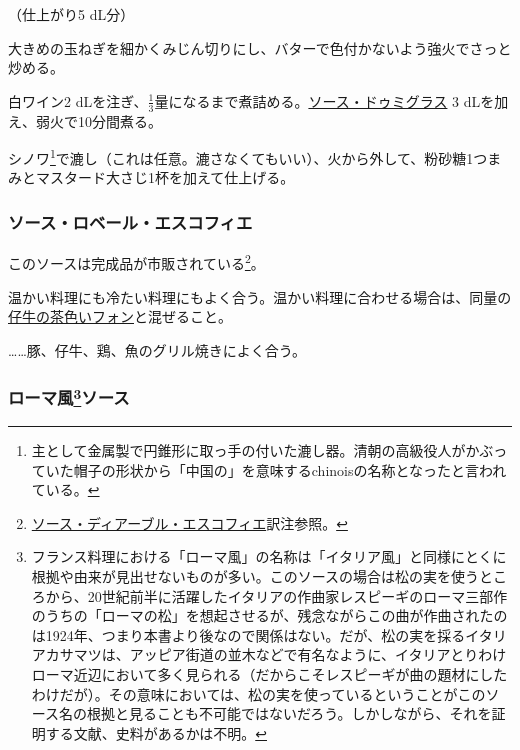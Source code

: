\begin{recette}

 

（仕上がり5 dL分）

大きめの玉ねぎを細かくみじん切りにし、バターで色付かないよう強火でさっと炒める。

白ワイン2
dLを注ぎ、\(\frac{1}{3}\)量になるまで煮詰める。\protect\hyperlink{sauce-demi-glace}{ソース・ドゥミグラス}
3 dLを加え、弱火で10分間煮る。

シノワ\footnote{主として金属製で円錐形に取っ手の付いた漉し器。清朝の高級役人がかぶっていた帽子の形状から「中国の」を意味するchinoisの名称となったと言われている。}で漉し（これは任意。漉さなくてもいい）、火から外して、粉砂糖1つまみとマスタード大さじ1杯を加えて仕上げる。

\atoaki{}

\hypertarget{sauce-robert-escoffier}{%
\subsubsection{ソース・ロベール・エスコフィエ}\label{sauce-robert-escoffier}}



このソースは完成品が市販されている\footnote{\protect\hyperlink{sauce-diable-escoffier}{ソース・ディアーブル・エスコフィエ}訳注参照。}。

温かい料理にも冷たい料理にもよく合う。温かい料理に合わせる場合は、同量の\protect\hyperlink{jus-de-veau-brun}{仔牛の茶色いフォン}と混ぜること。

\ldots{}\ldots{}豚、仔牛、鶏、魚のグリル焼きによく合う。

\atoaki{}

\hypertarget{sauce-romaine}{%
\subsubsection[ローマ風ソース]{\texorpdfstring{ローマ風\footnote{フランス料理における「ローマ風」の名称は「イタリア風」と同様にとくに根拠や由来が見出せないものが多い。このソースの場合は松の実を使うところから、20世紀前半に活躍したイタリアの作曲家レスピーギのローマ三部作のうちの「ローマの松」を想起させるが、残念ながらこの曲が作曲されたのは1924年、つまり本書より後なので関係はない。だが、松の実を採るイタリアカサマツは、アッピア街道の並木などで有名なように、イタリアとりわけローマ近辺において多く見られる（だからこそレスピーギが曲の題材にしたわけだが）。その意味においては、松の実を使っているということがこのソース名の根拠と見ることも不可能ではないだろう。しかしながら、それを証明する文献、史料があるかは不明。}ソース}{ローマ風ソース}}\label{sauce-romaine}}


\end{recette}

